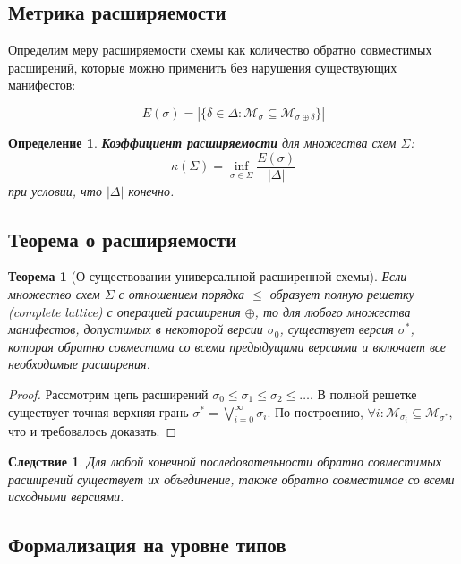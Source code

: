 \documentclass{article}
\newtheorem{theorem}{Теорема}
\newtheorem{definition}{Определение}
\newtheorem{corollary}{Следствие}
\begin{document}
\subsection{Метрика расширяемости}

Определим меру расширяемости схемы как количество обратно совместимых расширений, которые можно применить без нарушения существующих манифестов:

\[
E(\sigma) = |\{\delta \in \Delta : \mathcal{M}_{\sigma} \subseteq \mathcal{M}_{\sigma \oplus \delta}\}|
\]

\begin{definition}
\textbf{Коэффициент расширяемости} для множества схем $\Sigma$:
\[
\kappa(\Sigma) = \inf_{\sigma \in \Sigma} \frac{E(\sigma)}{|\Delta|}
\]
при условии, что $|\Delta|$ конечно.
\end{definition}

\subsection{Теорема о расширяемости}

\begin{theorem}[О существовании универсальной расширенной схемы]
Если множество схем $\Sigma$ с отношением порядка $\leq$ образует полную решетку (complete lattice) с операцией расширения $\oplus$, то для любого множества манифестов, допустимых в некоторой версии $\sigma_0$, существует версия $\sigma^*$, которая обратно совместима со всеми предыдущими версиями и включает все необходимые расширения.
\end{theorem}

\begin{proof}
Рассмотрим цепь расширений $\sigma_0 \leq \sigma_1 \leq \sigma_2 \leq \ldots$. В полной решетке существует точная верхняя грань $\sigma^* = \bigvee_{i=0}^{\infty} \sigma_i$. По построению, $\forall i: \mathcal{M}_{\sigma_i} \subseteq \mathcal{M}_{\sigma^*}$, что и требовалось доказать.
\end{proof}

\begin{corollary}
Для любой конечной последовательности обратно совместимых расширений существует их объединение, также обратно совместимое со всеми исходными версиями.
\end{corollary}

\subsection{Формализация на уровне типов}
\end{document}
